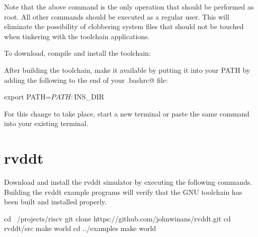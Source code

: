 Note that the above \verb@apt@ command is the only operation that should
be performed as root.  All other commands should be executed as a regular 
user.  This will eliminate the possibility of clobbering system files that 
should not be touched when tinkering with the toolchain applications.

%
To download, compile and install the toolchain:

\begin{minipage}{\textwidth}
\end{minipage}

After building the toolchain, make it available by putting it into
your PATH by adding the following to the end of your \verb@.bashrc@ file:

\begin{tty}
export PATH=$PATH:$INS_DIR
\end{tty}

For this \verb@PATH@ change to take place, start a new terminal or paste the
same \verb@export@ command into your existing terminal.



\section{rvddt}

Download and install the rvddt simulator by executing the following 
commands.
Building the rvddt example programs will verify that the GNU toolchain
has been built and installed properly.

\begin{minipage}{\textwidth}
\begin{tty}
cd ~/projects/riscv
git clone https://github.com/johnwinans/rvddt.git
cd rvddt/src
make world
cd ../examples
make world
\end{tty}
\end{minipage}

